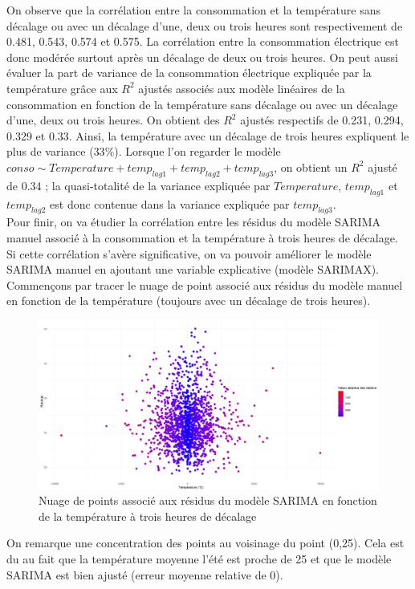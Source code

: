 \documentclass{article}
\theoremstyle{definition}
\theoremstyle{remark}
\begin{document}
On observe que la corrélation entre la consommation et la température sans décalage ou avec un décalage d'une, deux ou trois heures sont respectivement de 0.481, 0.543, 0.574 et 0.575. La corrélation entre la consommation électrique est donc modérée surtout après un décalage de deux ou trois heures.\newline
On peut aussi évaluer la part de variance de la consommation électrique expliquée par la température grâce aux $R^2$ ajustés associés aux modèle linéaires de la consommation en fonction de la température sans décalage ou avec un décalage d'une, deux ou trois heures. On obtient des $R^2$ ajustés respectifs de 0.231, 0.294, 0.329 et 0.33. Ainsi, la température avec un décalage de trois heures expliquent le plus de variance ($33\%$). \newline
Lorsque l'on regarder le modèle $conso\sim Temperature+temp_{lag1}+temp_{lag2}+temp_{lag3}$, on obtient un $R^2$ ajusté de 0.34 ; la quasi-totalité de la variance expliquée par $Temperature$, $temp_{lag1}$ et $temp_{lag2}$ est donc contenue dans la variance expliquée par $temp_{lag3}$.\newline \\
Pour finir, on va étudier la corrélation entre les résidus du modèle SARIMA manuel associé à la consommation et la température à trois heures de décalage. Si cette corrélation s'avère significative, on va pouvoir améliorer le modèle SARIMA manuel en ajoutant une variable explicative (modèle SARIMAX). \newpage
Commençons par tracer le nuage de point associé aux résidus du modèle manuel en fonction de la température (toujours avec un décalage de trois heures).
\FloatBarrier
\begin{figure}[!h]
    \centering
    \includegraphics[width=0.8\linewidth]{figterm.png}
    \caption{\centering Nuage de points associé aux résidus du modèle SARIMA en fonction de la température à trois heures de décalage}
    \label{fig:enter-label}
\end{figure}
On remarque une concentration des points au voisinage du point (0,25). Cela est du au fait que la température moyenne l'été est proche de 25 et que le modèle SARIMA est bien ajusté (erreur moyenne relative de 0).\newline
\end{document}
